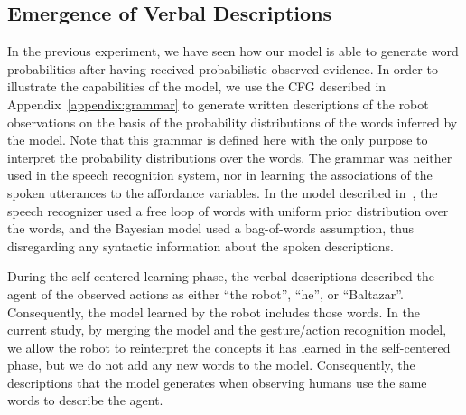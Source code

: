 \subsection{Emergence of Verbal Descriptions}

In the previous experiment, we have seen how our model is able to generate word probabilities after having received probabilistic observed evidence.
In order to illustrate the capabilities of the model, we use the \ac{CFG} described in Appendix~\ref{appendix:grammar} to generate written descriptions of the robot observations on the basis of the probability distributions of the words inferred by the model.
Note that this grammar is defined here with the only purpose to interpret the probability distributions over the words.
The grammar was neither used in the speech recognition system, nor in learning the associations of the spoken utterances to the affordance variables.
In the model described in~\cite{salvi:2012:smcb}, the speech recognizer used a free loop of words with uniform prior distribution over the words, and the Bayesian model used a bag-of-words assumption, thus disregarding any syntactic information about the spoken descriptions.

During the self-centered learning phase, the verbal descriptions described the agent of the observed actions as either ``the robot'', ``he'', or ``Baltazar''.
Consequently, the \AffWords{} model learned by the robot includes those words.
In the current study, by merging the \AffWords{} model and the gesture/action recognition model, we allow the robot to reinterpret the concepts it has learned in the self-centered phase, but we do not add any new words to the model.
Consequently, the descriptions that the model generates when observing humans use the same words to describe the agent.


